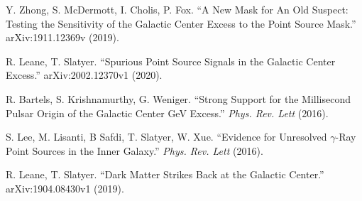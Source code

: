 \documentclass[11pt]{article}
\begin{document}
\begin{thebibliography}{99}
    Y. Zhong, S. McDermott, I. Cholis, P. Fox. ``A New Mask for An Old Suspect: Testing the Sensitivity of the Galactic Center Excess to the Point Source Mask.'' arXiv:1911.12369v (2019).


    
    R. Leane, T. Slatyer. ``Spurious Point Source Signals in the Galactic Center Excess.'' arXiv:2002.12370v1 (2020).


    
    R. Bartels, S. Krishnamurthy, G. Weniger. ``Strong Support for the Millisecond Pulsar Origin of the Galactic Center GeV Excess.'' \textit{Phys. Rev. Lett} (2016).


    
    S. Lee, M. Lisanti, B Safdi, T. Slatyer, W. Xue. ``Evidence for Unresolved $\gamma$-Ray Point Sources in the Inner Galaxy.'' \textit{Phys. Rev. Lett} (2016).


    
    R. Leane, T. Slatyer. ``Dark Matter Strikes Back at the Galactic Center.'' arXiv:1904.08430v1 (2019).


\end{thebibliography}
\end{document}
